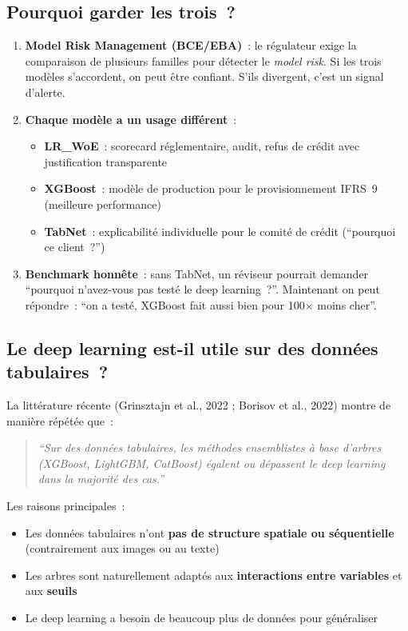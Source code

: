 \documentclass[12pt,a4paper]{article}
\begin{document}
\subsection{Pourquoi garder les trois~?}

\begin{enumerate}
    \item \textbf{Model Risk Management (BCE/EBA)}~: le r\'egulateur exige la comparaison de plusieurs familles pour d\'etecter le \textit{model risk}. Si les trois mod\`eles s'accordent, on peut \^etre confiant. S'ils divergent, c'est un signal d'alerte.

    \item \textbf{Chaque mod\`ele a un usage diff\'erent}~:
    \begin{itemize}[noitemsep]
        \item \textbf{LR\_WoE}~: scorecard r\'eglementaire, audit, refus de cr\'edit avec justification transparente
        \item \textbf{XGBoost}~: mod\`ele de production pour le provisionnement IFRS~9 (meilleure performance)
        \item \textbf{TabNet}~: explicabilit\'e individuelle pour le comit\'e de cr\'edit (``pourquoi ce client~?'')
    \end{itemize}

    \item \textbf{Benchmark honnête}~: sans TabNet, un r\'eviseur pourrait demander ``pourquoi n'avez-vous pas test\'e le deep learning~?''. Maintenant on peut r\'epondre~: ``on a test\'e, XGBoost fait aussi bien pour 100$\times$ moins cher''.
\end{enumerate}

\subsection{Le deep learning est-il utile sur des donn\'ees tabulaires~?}

La litt\'erature r\'ecente (Grinsztajn et al., 2022 ; Borisov et al., 2022) montre de mani\`ere r\'ep\'et\'ee que~:

\begin{quote}
\textit{``Sur des donn\'ees tabulaires, les m\'ethodes ensemblistes \`a base d'arbres (XGBoost, LightGBM, CatBoost) \'egalent ou d\'epassent le deep learning dans la majorit\'e des cas.''}
\end{quote}

Les raisons principales~:
\begin{itemize}
    \item Les donn\'ees tabulaires n'ont \textbf{pas de structure spatiale ou s\'equentielle} (contrairement aux images ou au texte)
    \item Les arbres sont naturellement adapt\'es aux \textbf{interactions entre variables} et aux \textbf{seuils}
    \item Le deep learning a besoin de beaucoup plus de donn\'ees pour g\'en\'eraliser
\end{itemize}
\end{document}
